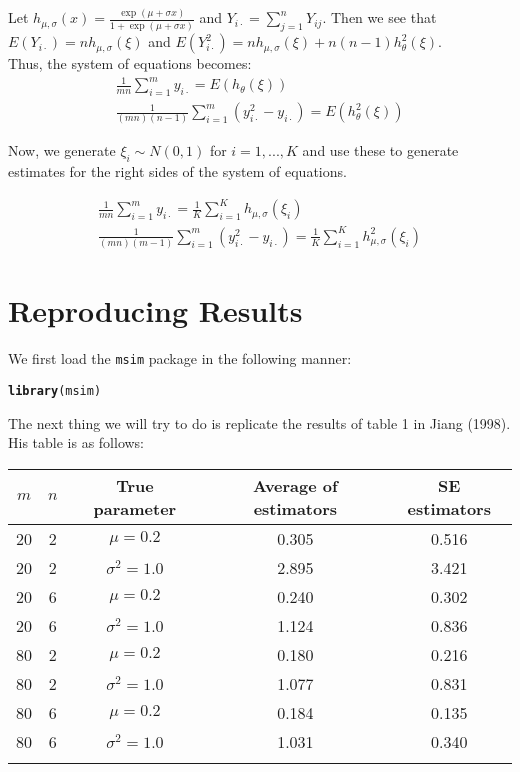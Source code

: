 \documentclass{article}\usepackage{graphicx, color}
\makeatletter
\newcommand{\hlfunctioncall}[1]{\textcolor[rgb]{0.501960784313725,0,0.329411764705882}{\textbf{#1}}}%
\newenvironment{kframe}{%
 \def\at@end@of@kframe{}%
 \ifinner\ifhmode%
  \def\at@end@of@kframe{\end{minipage}}%
  \begin{minipage}{\columnwidth}%
 \fi\fi%
 \def\FrameCommand##1{\hskip\@totalleftmargin \hskip-\fboxsep
 \colorbox{shadecolor}{##1}\hskip-\fboxsep
     \hskip-\linewidth \hskip-\@totalleftmargin \hskip\columnwidth}%
 \MakeFramed {\advance\hsize-\width
   \@totalleftmargin\z@ \linewidth\hsize
   \@setminipage}}%
 {\par\unskip\endMakeFramed%
 \at@end@of@kframe}
\newenvironment{knitrout}{}{} %
\makeatother
\begin{document}
Let $h_{\mu,\sigma}(x)=\frac{\exp(\mu+\sigma x)}{1+\exp(\mu+\sigma x)}$ and $Y_{i\cdot}=\sum_{j=1}^n{Y_{ij}}$.  Then we see that $E(Y_{i\cdot})=nh_{\mu,\sigma}(\xi)$ and  $E(Y_{i\cdot}^2)=nh_{\mu,\sigma}(\xi)+n(n-1)h_\theta^2(\xi)$.\\

Thus, the system of equations becomes:
\begin{align*}
\frac{1}{mn}\sum_{i=1}^m y_{i\cdot}=E(h_\theta(\xi))\\
\frac{1}{(mn)(n-1)}\sum_{i=1}^m (y_{i\cdot}^2-y_{i\cdot})=E(h_\theta^2(\xi))
\end{align*}

Now, we generate $\xi_i \sim N(0,1)$ for $i=1,...,K$ and use these to generate estimates for the right sides of the system of equations. 

\begin{align*}
\frac{1}{mn}\sum_{i=1}^m y_{i\cdot}=\frac{1}{K}\sum_{i=1}^K h_{\mu,\sigma}(\xi_i)\\
\frac{1}{(mn)(m-1)}\sum_{i=1}^m (y_{i\cdot}^2-y_{i\cdot})=\frac{1}{K}\sum_{i=1}^K h_{\mu,\sigma}^2(\xi_i)
\end{align*}

\newpage\section{Reproducing Results}

We first load the {\tt msim} package in the following manner:
\begin{knitrout}\footnotesize
{}\color{fgcolor}\begin{kframe}
\begin{alltt}
\hlfunctioncall{library}(msim)
\end{alltt}
\end{kframe}
\end{knitrout}


The next thing we will try to do is replicate the results of table 1 in Jiang (1998).  His table is as follows:\\
\begin{tabular}{c c c c c}
$m$ & $n$ &True parameter &Average of estimators & SE estimators\\
\hline
20& 2& $\mu=0.2$& 0.305& 0.516\\
20& 2& $\sigma^2=1.0$& 2.895& 3.421\\
20& 6& $\mu=0.2$& 0.240& 0.302\\
20& 6& $\sigma^2=1.0$& 1.124& 0.836\\
80& 2& $\mu=0.2$& 0.180& 0.216\\
80& 2& $\sigma^2=1.0$& 1.077& 0.831\\
80& 6& $\mu=0.2$& 0.184 & 0.135\\
80& 6& $\sigma^2=1.0$& 1.031& 0.340\\\\
\end{tabular}
\end{document}

